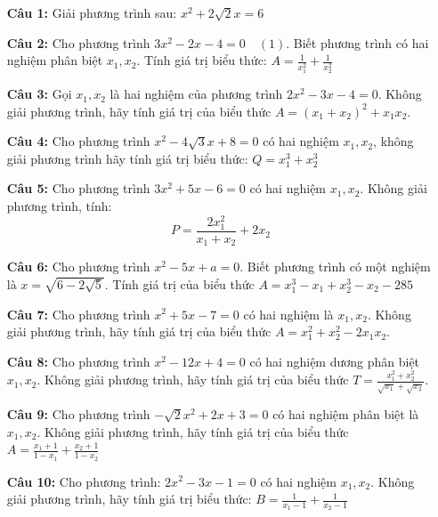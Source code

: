 \documentclass[12pt,a4paper]{extarticle}
\begin{document}
\vspace{1em}
\begin{enumerate}
    \item[\textbf{Câu 1:}] Giải phương trình sau: $x^2 + 2\sqrt{2}x = 6$
    
    \item[\textbf{Câu 2:}] Cho phương trình $3x^2 - 2x - 4 = 0 \quad (1)$. Biết phương trình có hai nghiệm phân biệt $x_1, x_2$. Tính giá trị biểu thức: $A = \frac{1}{x_1^2} + \frac{1}{x_2^2}$
    
    \item[\textbf{Câu 3:}] Gọi $x_1, x_2$ là hai nghiệm của phương trình $2x^2 - 3x - 4 = 0$. Không giải phương trình, hãy tính giá trị của biểu thức $A = (x_1 + x_2)^2 + x_1 x_2$.
    
    \item[\textbf{Câu 4:}] Cho phương trình $x^2 - 4\sqrt{3}x + 8 = 0$ có hai nghiệm $x_1, x_2$, không giải phương trình hãy tính giá trị biểu thức: $Q = x_1^3 + x_2^3$
    
    \item[\textbf{Câu 5:}] Cho phương trình $3x^2 + 5x - 6 = 0$ có hai nghiệm $x_1, x_2$. Không giải phương trình, tính:
    \[ P = \frac{2x_1^2}{x_1 + x_2} + 2x_2 \]
    
    \item[\textbf{Câu 6:}] Cho phương trình $x^2 - 5x + a = 0$. Biết phương trình có một nghiệm là $x = \sqrt{6 - 2\sqrt{5}}$. Tính giá trị của biểu thức $A = x_1^3 - x_1 + x_2^3 - x_2 - 285$
    
    \item[\textbf{Câu 7:}] Cho phương trình $x^2 + 5x - 7 = 0$ có hai nghiệm là $x_1, x_2$. Không giải phương trình, hãy tính giá trị của biểu thức $A = x_1^2 + x_2^2 - 2x_1 x_2$.
    
    \item[\textbf{Câu 8:}] Cho phương trình $x^2 - 12x + 4 = 0$ có hai nghiệm dương phân biệt $x_1, x_2$. Không giải phương trình, hãy tính giá trị của biểu thức $T = \frac{x_1^2 + x_2^2}{\sqrt{x_1} + \sqrt{x_2}}$.
    
    \item[\textbf{Câu 9:}] Cho phương trình $-\sqrt{2}x^2 + 2x + 3 = 0$ có hai nghiệm phân biệt là $x_1, x_2$. Không giải phương trình, hãy tính giá trị của biểu thức $A = \frac{x_1 + 1}{1 - x_1} + \frac{x_2 + 1}{1 - x_2}$
    
    \item[\textbf{Câu 10:}] Cho phương trình: $2x^2 - 3x - 1 = 0$ có hai nghiệm $x_1, x_2$. Không giải phương trình, hãy tính giá trị biểu thức: $B = \frac{1}{x_1 - 1} + \frac{1}{x_2 - 1}$
\end{enumerate}
\end{document}
